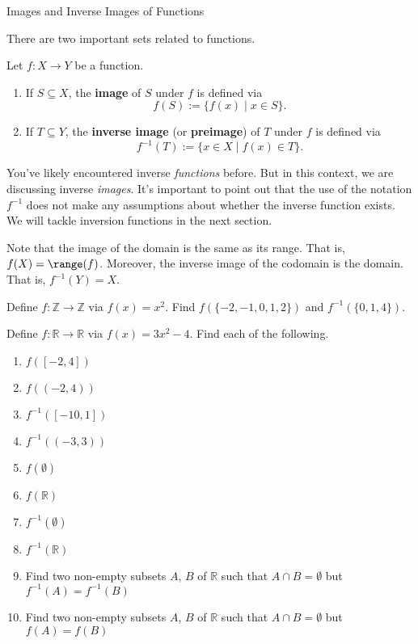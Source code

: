 \begin{section}{Images and Inverse Images of Functions}\label{sec:Images and Inverse Images}

There are two important sets related to functions.

\begin{definition}
Let $f:X\to Y$ be a function.  \begin{enumerate}[label=\textrm{(\alph*)}]
\item If $S\subseteq X$, the \textbf{image} of $S$ under $f$ is defined via
\[
f(S):=\{f(x) \mid  x\in S\}.
\]
\item  If $T\subseteq Y$, the \textbf{inverse image} (or \textbf{preimage}) of $T$ under $f$ is defined via
\[
f^{-1}(T):=\{x\in X \mid  f(x)\in T\}.
\]
\end{enumerate}
\end{definition}

You've likely encountered inverse \emph{functions} before. But in this context, we are discussing inverse \emph{images}. It's important to point out that the use of the notation $f^{-1}$ does not make any assumptions about whether the inverse function exists. We will tackle inversion functions in the next section.

Note that the image of the domain is the same as its range.  That is, $f(X)=\range(f)$. Moreover, the inverse image of the codomain is the domain.  That is, $f^{-1}(Y)=X$.

\begin{exercise}
Define $f:\mathbb{Z}\to\mathbb{Z}$ via $f(x)=x^2$. Find $f(\{-2,-1,0,1,2\})$ and $f^{-1}(\{0,1,4\})$.
\end{exercise}

\begin{exercise}
Define $f:\mathbb{R}\to\mathbb{R}$ via $f(x)=3x^2-4$.
Find each of the following.
\begin{enumerate}[label=\textrm{(\alph*)}]
\item $f([-2,4])$
\item $f((-2,4))$
\item $f^{-1}([-10,1])$
\item $f^{-1}((-3,3))$
\item $f(\emptyset)$
\item $f(\mathbb{R})$
\item $f^{-1}(\emptyset)$
\item $f^{-1}(\mathbb{R})$
\item Find two non-empty subsets $A$, $B$ of $\mathbb{R}$ such that $A\cap B=\emptyset$ but $f^{-1}(A)=f^{-1}(B)$
\item Find two non-empty subsets $A$, $B$ of $\mathbb{R}$ such that $A\cap B=\emptyset$ but $f(A)=f(B)$
\end{enumerate}
\end{exercise}


\end{section}

